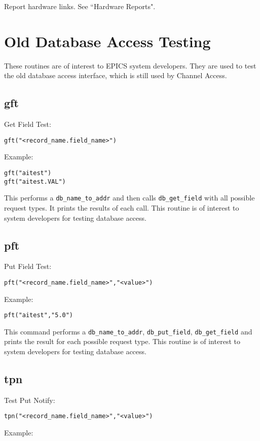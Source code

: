 Report hardware links. See ``Hardware Reports".

\section{Old Database Access Testing}

These routines are of interest to EPICS system developers. They are used to test the old database access interface, which 
is still used by Channel Access.

\subsection{gft}

Get Field Test:

\begin{verbatim}gft("<record_name.field_name>")
\end{verbatim}Example:

\begin{verbatim}gft("aitest")
gft("aitest.VAL")
\end{verbatim}This performs a \verb|db_name_to_addr| and then calls \verb|db_get_field| with all possible request types. It prints the results 
of each call. This routine is of interest to system developers for testing database access.

\subsection{pft}

Put Field Test:

\begin{verbatim}pft("<record_name.field_name>","<value>")
\end{verbatim}Example:

\begin{verbatim}pft("aitest","5.0")
\end{verbatim}This command performs a \verb|db_name_to_addr|, \verb|db_put_field|, \verb|db_get_field| and prints the result for each 
possible request type. This routine is of interest to system developers for testing database access.

\subsection{tpn}

Test Put Notify:

\begin{verbatim}tpn("<record_name.field_name>","<value>")
\end{verbatim}Example:


